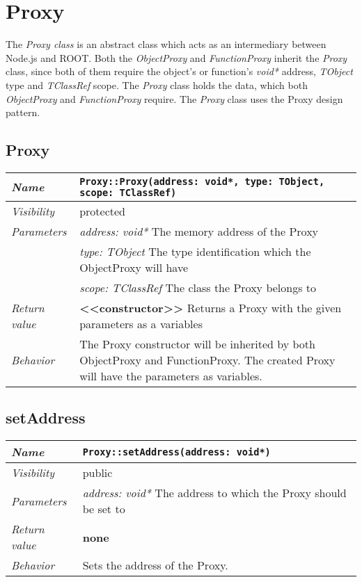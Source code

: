 \chapter{Proxy}
The \textit{Proxy class} is an abstract class which acts as an intermediary between Node.js and ROOT. Both the \textit{ObjectProxy} and \textit{FunctionProxy} inherit the \textit{Proxy} class, since both of them require the object's or function's \textit{void*} address, \textit{TObject} type and \textit{TClassRef} scope. The \textit{Proxy} class holds the data, which both \textit{ObjectProxy} and \textit{FunctionProxy} require. The \textit{Proxy} class uses the Proxy design pattern.
\section{Proxy}
\begin{longtable}{p{3cm} @{\hskip 1cm} p{12cm}}
 \hline
\textit{Name} & \texttt{Proxy::Proxy(address: void*, type: TObject, scope: TClassRef)}\\
\hline
 \textit{Visibility} & protected\\
\hline
\textit{Parameters} & \textit{address: void*} The memory address of the Proxy \\
& \textit{type: TObject}  The type identification which the ObjectProxy will have \\
& \textit{scope: TClassRef} The class the Proxy belongs to \\
\hline
\textit{Return value} & \textbf{ <<constructor>>} Returns a Proxy with the given parameters as a variables \\
  \hline
 \textit{Behavior} & The Proxy constructor will be inherited by both ObjectProxy and FunctionProxy.
 The created Proxy will have the parameters as variables. \\
\hline
\end{longtable} \pagebreak
 \section{setAddress}
\begin{longtable}{p{3cm} @{\hskip 1cm} p{12cm}}
 \hline
\textit{Name} & \texttt{Proxy::setAddress(address: void*)}\\
\hline
 \textit{Visibility} & public\\
\hline
\textit{Parameters} & \textit{address: void*} The address to which the Proxy should be set to \\
\hline
\textit{Return value} & \textbf{none}\\
  \hline
 \textit{Behavior} & Sets the address of the Proxy. \\
\hline
\end{longtable} \pagebreak
